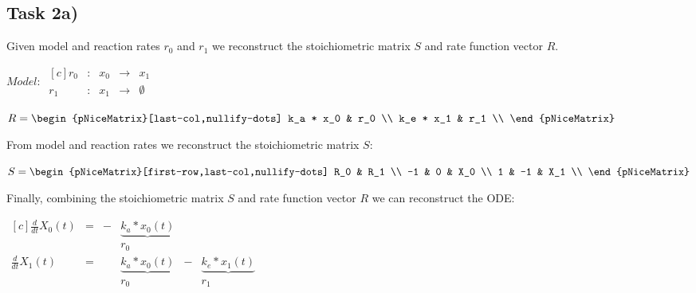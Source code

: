 \documentclass[]{scrartcl}
\begin{document}

\subsection*{Task 2a)}

Given model and reaction rates $r_0$ and $r_1$ we reconstruct the stoichiometric matrix $S$ and rate function vector $R$.

\begin{center}
\noindent \begin{minipage}{.4\linewidth}
$ Model:~ 
\begin{matrix*}[c]
	r_0 & : & x_0 & \rightarrow & x_1 \\
	r_1 & : & x_1 & \rightarrow & \emptyset
\end{matrix*}
$
\end{minipage}
\noindent \begin{minipage}{.4\linewidth}
$
R =
\begin{pNiceMatrix}[last-col,nullify-dots]
	k_a * x_0 & r_0 \\
	k_e	* x_1 & r_1 \\
\end{pNiceMatrix}
$
\end{minipage}
\end{center}

\noindent
From model and reaction rates we reconstruct the stoichiometric matrix $S$:

\noindent \begin{center}
\begin{minipage}{.4\linewidth}
$
S =
\begin{pNiceMatrix}[first-row,last-col,nullify-dots]
	R_0	&	R_1 \\
	 -1 &	  0 &	X_0 \\
	  1 &	 -1 &	X_1 \\
\end{pNiceMatrix}
$
\end{minipage}
\end{center}

\noindent 
Finally, combining the stoichiometric matrix $S$ and rate function vector $R$ we can reconstruct the ODE:

\noindent \begin{center}
\begin{minipage}{.5\linewidth}
$
\begin{matrix*}[c]
	\frac{d}{dt} X_0(t) & = & - & \underbrace{k_a * x_0(t)}	&	& 							\\ 
					    &   &   & 							r_0 &   &							\\
	\frac{d}{dt} X_1(t) & = &   & \underbrace{k_a * x_0(t)}	& - & \underbrace{k_e * x_1(t)}	\\
					    &   &   & 							r_0 &   &					r_1 
\end{matrix*}
$
\end{minipage}
\end{center}
\end{document}
